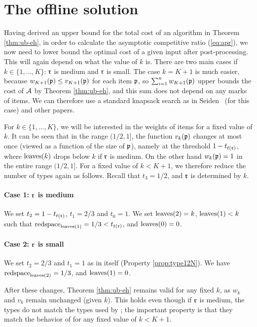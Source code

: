 \section{The offline solution} \label{sec:offline-solution}
Having derived an upper bound for the total cost of an \EHarm{} algorithm
in Theorem \ref{thm:ub-eh}, in order to calculate the asymptotic competitive
ratio (\ref{eq:apr}), we now need to lower bound the optimal cost of a given input
after post-processing. This will again depend on what the value of $k$ is.
There are two main cases if $k\in\{1,\dots,K\}$: {$\mathfrak{r}$ is medium and $\mathfrak{r}$ is small}.
The case $k=K+1$ is much easier, because $w_{K+1}(\mathfrak{p})\le v_{K+1}(\mathfrak{p})$ for each item $\mathfrak{p}$,
so $\sum_{i=1}^n w_{K+1}(\mathfrak{p})$
upper bounds the cost of $\mathcal{A}$ by Theorem \ref{thm:ub-eh}, 
and this sum does not depend on any marks of items.
We can therefore use a standard knapsack search
as in Seiden~\cite{Seiden02} (for this case) and other papers.

For $k\in\{1,\dots,K\}$, we will be interested in the weights of items for a fixed value of $k$.
It can be seen that in the range $(1/2,1]$, the function $v_{k}(\mathfrak{p})$ changes at most once
(viewed as a function of the size of $\mathfrak{p}$), namely at the threshold $1-t_{t(\mathfrak{r})}$,
where $\mathrm{leaves}(k)$ drops below $k$ if $\mathfrak{r}$ is medium.
On the other hand $w_k(\mathfrak{p})=1$ in the entire range $(1/2,1]$.
For a fixed value of $k<K+1$, we therefore reduce the number of types again as follows. 
Recall that $t_3=1/2$, and $\mathfrak{r}$ is determined by $k$.

\paragraph{Case 1: $\mathfrak{r}$ is medium}
We set $t_2=1-t_{t(\mathfrak{r})}$, $t_1=2/3$ and $t_0=1$. We set $\mathrm{leaves}(2)=k$, 
$\mathrm{leaves}(1)<k$ such that $\mathrm{redspace}_{\mathrm{leaves}(1)}=1/3 < t_{t(\mathfrak{r})}$, and $\mathrm{leaves}(0)=0$.

\paragraph{Case 2: $\mathfrak{r}$ is small}
We set $t_2=2/3$ and $t_1=1$ as in {\EHarm} itself (Property \ref{prop:type12N}).
We have $\mathrm{redspace}_{\mathrm{leaves}(2)}=1/3$, and $\mathrm{leaves}(1)=0$.

\vspace{10pt}
After these changes, Theorem \ref{thm:ub-eh} remains valid for any fixed $k$, as $w_k$ and $v_k$ remain
unchanged (given $k$).
This holds even though if $\mathfrak{r}$ is medium, the types do not match the types used by {\EHarm};
the important property is that they match the behavior of {\EHarm} for any fixed value of $k<K+1$.


